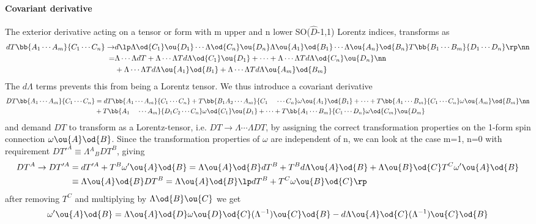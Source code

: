 \paragraph{Covariant derivative}
The exterior derivative acting on a tensor or form with m upper and n lower SO($\hat D$-1,1) Lorentz indices, transforms as
\begin{align}
dT\bb{A_1\cdots A_m}{C_1\cdots C_n} \rightarrow& d \lp\Lambda\od{C_1}\ou{D_1}\cdots \Lambda\od{C_n}\ou{D_n}\Lambda\ou{A_1}\od{B_1}\cdots \Lambda\ou{A_n}\od{B_n}T\bb{B_1\cdots B_m}{D_1\cdots D_n}\rp\nn\\ 
 =& \Lambda\cdots\Lambda dT + \Lambda\cdots\Lambda Td\Lambda\od{C_1}\ou{D_1}+\cdots+\Lambda\cdots\Lambda Td\Lambda\od{C_n}\ou{D_n}\nn\\
&+\Lambda\cdots\Lambda Td\Lambda\ou{A_1}\od{B_1}+\Lambda\cdots\Lambda Td\Lambda\ou{A_m}\od{B_m}
\end{align}
The $d\Lambda$ terms prevents this from being a Lorentz tensor. We thus introduce a covariant derivative
\begin{align}
DT\bb{A_1\cdots A_m}{C_1\cdots C_n} &= dT\bb{A_1\cdots A_m}{C_1\cdots C_n} + T\bb{B_1A_2\cdots A_m}{C_1\phantom{A_2}\cdots C_n}\omega\ou{A_1}\od{B_1} + \cdots + T\bb{A_1\cdots B_m}{C_1\cdots C_n}\omega\ou{A_m}\od{B_m}\nn\\
& + T\bb{A_1\phantom{C_2}\cdots A_m}{D_1C_2\cdots C_n}\omega\od{C_1}\ou{D_1} + \cdots + T\bb{A_1\cdots B_m}{C_1\cdots D_n}\omega\od{C_m}\ou{D_m} 
\end{align}
and demand $DT$ to transform as a Lorentz-tensor, i.e. $DT\rightarrow \Lambda\cdots\Lambda DT$, by assigning the correct transformation properties on the 1-form spin connection $\omega\ou{A}\od{B}$.
Since the transformation properties of $\omega$ are independent of n, we can look at the case m=1, n=0 with requirement $DT'^A \equiv \Lambda{^A}_B DT^B$, giving
\begin{align}
DT^A \rightarrow DT'^A &= dT'^A + T^B\omega'\ou{A}\od{B} = \Lambda\ou{A}\od{B}dT^{B} + T^{B}d\Lambda\ou{A}\od{B} + \Lambda\ou{B}\od{C}T^C\omega'\ou{A}\od{B} \nonumber\\
& \equiv \Lambda\ou{A}\od{B}DT^B = \Lambda\ou{A}\od{B}\lp dT^B + T^C\omega\ou{B}\od{C}\rp
\end{align}
after removing $T^C$ and multiplying by $\Lambda\od{B}\ou{C}$ we get
\begin{equation}
\omega'\ou{A}\od{B} = \Lambda\ou{A}\od{D}\omega\ou{D}\od{C}(\Lambda^{-1})\ou{C}\od{B} -  d\Lambda\ou{A}\od{C}(\Lambda^{-1})\ou{C}\od{B}
\end{equation}
